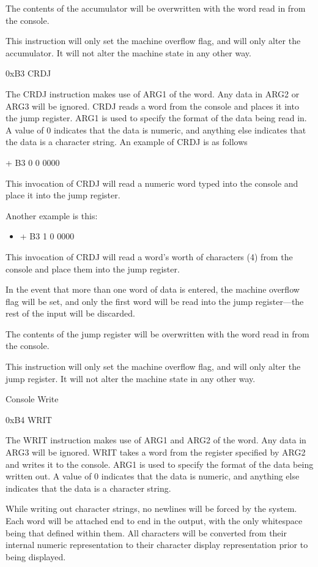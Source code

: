 \documentclass[]{article}
\providecommand{\tightlist}{%
  \setlength{\itemsep}{0pt}\setlength{\parskip}{0pt}}
\begin{document}
The contents of the accumulator will be overwritten with the word read
in from the console.

This instruction will only set the machine overflow flag, and will only
alter the accumulator. It will not alter the machine state in any other
way.

0xB3 CRDJ

The CRDJ instruction makes use of ARG1 of the word. Any data in ARG2 or
ARG3 will be ignored. CRDJ reads a word from the console and places it
into the jump register. ARG1 is used to specify the format of the data
being read in. A value of 0 indicates that the data is numeric, and
anything else indicates that the data is a character string. An example
of CRDJ is as follows

+ B3 0 0 0000

This invocation of CRDJ will read a numeric word typed into the console
and place it into the jump register.

Another example is this:

\begin{itemize}
\tightlist
\item
  + B3 1 0 0000
\end{itemize}

This invocation of CRDJ will read a word's worth of characters (4) from
the console and place them into the jump register.

In the event that more than one word of data is entered, the machine
overflow flag will be set, and only the first word will be read into the
jump register---the rest of the input will be discarded.

The contents of the jump register will be overwritten with the word read
in from the console.

This instruction will only set the machine overflow flag, and will only
alter the jump register. It will not alter the machine state in any
other way.

Console Write

0xB4 WRIT

The WRIT instruction makes use of ARG1 and ARG2 of the word. Any data in
ARG3 will be ignored. WRIT takes a word from the register specified by
ARG2 and writes it to the console. ARG1 is used to specify the format of
the data being written out. A value of 0 indicates that the data is
numeric, and anything else indicates that the data is a character
string.

While writing out character strings, no newlines will be forced by the
system. Each word will be attached end to end in the output, with the
only whitespace being that defined within them. All characters will be
converted from their internal numeric representation to their character
display representation prior to being displayed.
\end{document}
